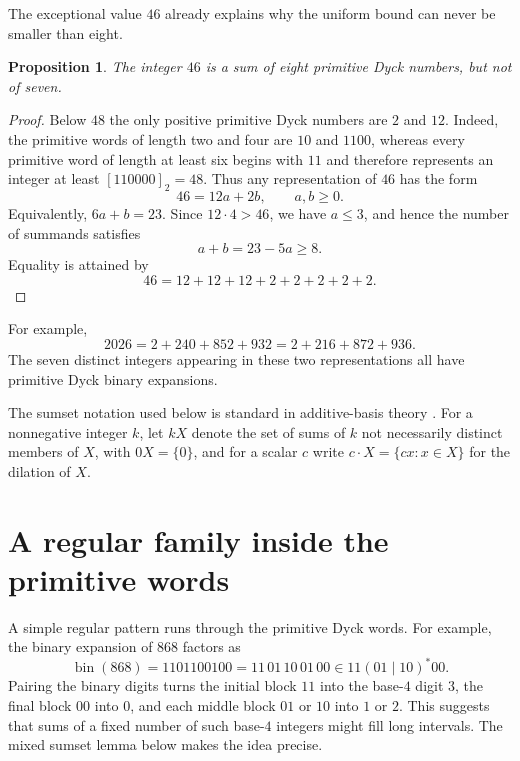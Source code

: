 \documentclass[12pt]{article}
\theoremstyle{plain}
\newtheorem{proposition}[theorem]{Proposition}
\begin{document}
The exceptional value $46$ already explains why the uniform bound can
never be smaller than eight.

\begin{proposition}\label{prop:46}
The integer $46$ is a sum of eight primitive Dyck numbers, but not of
seven.
\end{proposition}

\begin{proof}
Below $48$ the only positive primitive Dyck numbers are $2$ and $12$.
Indeed, the primitive words of length two and four are $10$ and $1100$,
whereas every primitive word of length at least six begins with $11$ and
therefore represents an integer at least $[110000]_2=48$.  Thus any
representation of $46$ has the form
\[
        46=12a+2b,\qquad a,b\geq0.
\]
Equivalently, $6a+b=23$.  Since $12\cdot4>46$, we have $a\leq3$, and
hence the number of summands satisfies
\[
        a+b=23-5a\geq8.
\]
Equality is attained by
\[
        46=12+12+12+2+2+2+2+2.
\]
\end{proof}

For example,
\[
 2026=2+240+852+932=2+216+872+936.
\]
The seven distinct integers appearing in these two representations all
have primitive Dyck binary expansions.

The sumset notation used below is standard in additive-basis theory
\cite[Chap.\ 1]{Nathanson}.  For a nonnegative integer $k$, let $kX$ denote the
set of sums of $k$ not necessarily distinct members of $X$, with
$0X=\{0\}$, and for a scalar $c$ write
$c\cdot X=\{cx:x\in X\}$ for the dilation of $X$.


\section{A regular family inside the primitive words}

A simple regular pattern runs through the primitive Dyck words.  For
example, the binary expansion of $868$ factors as
\[
 \operatorname{bin}(868)=1101100100=11\,01\,10\,01\,00
 \in 11(01\mid10)^*00 .
\]
Pairing the binary digits turns the initial block $11$ into the base-$4$
digit $3$, the final block $00$ into $0$, and each middle block $01$ or
$10$ into $1$ or $2$.  This suggests that sums of a fixed number of such
base-$4$ integers might fill long intervals.  The mixed sumset lemma
below makes the idea precise.
\end{document}
